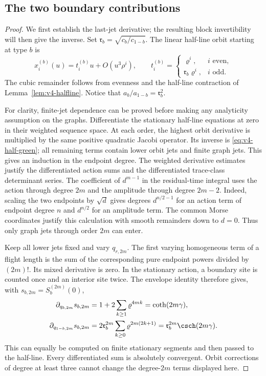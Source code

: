 \subsection{The two boundary contributions}
\begin{proof}
We first establish the last-jet derivative; the resulting block
invertibility will then give the inverse. Set
$\mathfrak r_b=\sqrt{c_b/c_{1-b}}$. The linear half-line orbit starting at type
$b$ is
\begin{equation}\label{eq:v12-linear-orbit}
 x_i^{(b)}(u)=t_i^{(b)}u+O(u^3\rho^i),\qquad
 t_i^{(b)}=
 \begin{cases}\varrho^i,&i\text{ even},\\
                \mathfrak r_b\varrho^i,&i\text{ odd}.
 \end{cases}
\end{equation}
The cubic remainder follows from evenness and the half-line contraction
of Lemma~\ref{lem:v4-halfline}. Notice that
$a_b/a_{1-b}=\mathfrak r_b^2$.

For clarity, finite-jet dependence can be proved before making any
analyticity assumption on the graphs. Differentiate the stationary
half-line equations at zero in their weighted sequence space. At each
order, the highest orbit derivative is multiplied by the same positive
quadratic Jacobi operator. Its inverse is
\eqref{eq:v4-half-green}; all remaining terms contain lower orbit
jets and finite graph jets. This gives an induction in the endpoint
degree. The weighted derivative estimates justify the differentiated
action sums and the differentiated trace-class determinant series.
The coefficient of $d^{m-1}$ in the residual-time integral uses the
action through degree $2m$ and the amplitude through degree $2m-2$.
Indeed, scaling the two endpoints by $\sqrt d$ gives degrees
$d^{n/2-1}$ for an action term of endpoint degree $n$ and $d^{n/2}$
for an amplitude term. The common Morse coordinates justify this
calculation with smooth remainders down to $d=0$. Thus only graph
jets through order $2m$ can enter.

Keep all lower jets fixed and vary $q_{r,2m}$. The first varying
homogeneous term of a flight length is the sum of the corresponding
pure endpoint powers divided by $(2m)!$. Its mixed derivative is
zero. In the stationary action, a boundary site is counted once and
an interior site twice. The envelope identity therefore gives, with
$s_{b,2m}=S_b^{(2m)}(0)$,
\begin{align}
 \partial_{q_{b,2m}}s_{b,2m}
 &=1+2\sum_{k\ge1}\varrho^{4mk}=\coth(2m\gamma),\notag\\
 \partial_{q_{1-b,2m}}s_{b,2m}
 &=2\mathfrak r_b^{2m}\sum_{k\ge0}\varrho^{2m(2k+1)}
                   =\mathfrak r_b^{2m}\csch(2m\gamma).
                                      \label{eq:v12-action-block}
\end{align}
This can equally be computed on finite stationary segments and then
passed to the half-line. Every differentiated sum is absolutely
convergent. Orbit corrections of degree at least three cannot change
the degree-$2m$ terms displayed here.


\end{proof}
